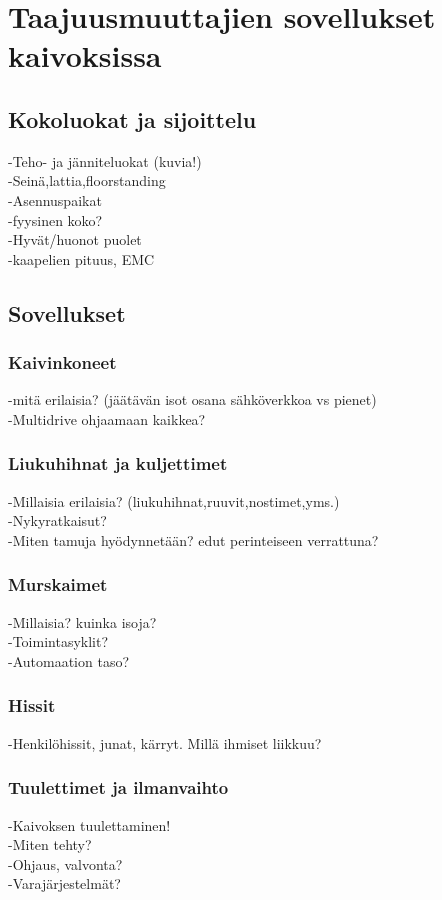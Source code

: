 \documentclass[finnish,12pt,a4paper,pdftex,elec,utf8]{aaltothesis}
\begin{document}
\clearpage

\section{Taajuusmuuttajien sovellukset kaivoksissa}

\subsection{Kokoluokat ja sijoittelu}
-Teho- ja jänniteluokat (kuvia!)\\
-Seinä,lattia,floorstanding\\
-Asennuspaikat\\
-fyysinen koko?\\
-Hyvät/huonot puolet\\
-kaapelien pituus, EMC

\subsection{Sovellukset}
\subsubsection{Kaivinkoneet}
-mitä erilaisia? (jäätävän isot osana sähköverkkoa vs pienet)\\
-Multidrive ohjaamaan kaikkea?


\subsubsection{Liukuhihnat ja kuljettimet}
-Millaisia erilaisia? (liukuhihnat,ruuvit,nostimet,yms.)\\
-Nykyratkaisut?\\
-Miten tamuja hyödynnetään? edut perinteiseen verrattuna?

\subsubsection{Murskaimet}
-Millaisia? kuinka isoja?\\
-Toimintasyklit? \cite{Hulthen}\\
-Automaation taso?

\subsubsection{Hissit}
-Henkilöhissit, junat, kärryt. Millä ihmiset liikkuu?

\subsubsection{Tuulettimet ja ilmanvaihto}
-Kaivoksen tuulettaminen!\\
-Miten tehty?\\
-Ohjaus, valvonta?\\
-Varajärjestelmät?
\end{document}
